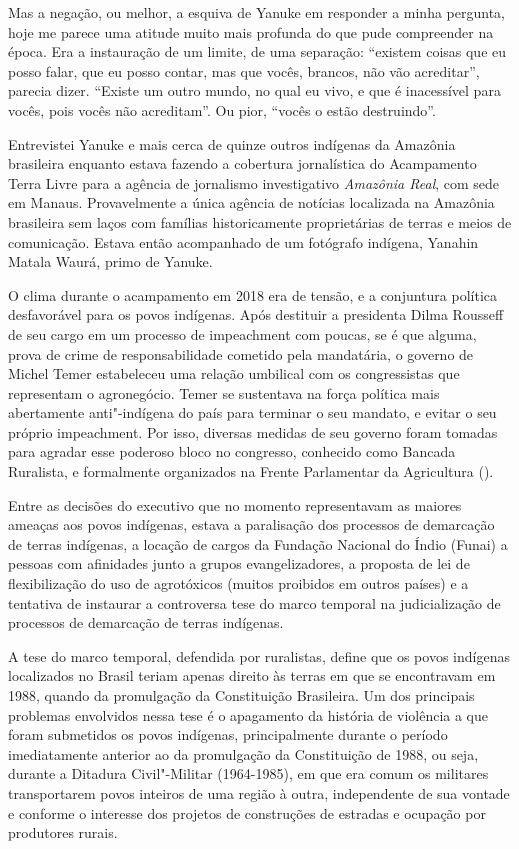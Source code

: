 Mas a negação, ou melhor, a esquiva de Yanuke em responder a minha
pergunta, hoje me parece uma atitude muito mais profunda do que pude
compreender na época. Era a instauração de um limite, de uma separação:
``existem coisas que eu posso falar, que eu posso contar, mas que vocês,
brancos, não vão acreditar'', parecia dizer. ``Existe um outro mundo, no
qual eu vivo, e que é inacessível para vocês, pois vocês não
acreditam''. Ou pior, ``vocês o estão destruindo''.

\asterisc

Entrevistei Yanuke e mais cerca de quinze outros indígenas da Amazônia
brasileira enquanto estava fazendo a cobertura jornalística do
Acampamento Terra Livre para a agência de jornalismo investigativo
\emph{Amazônia Real}, com sede em Manaus. Provavelmente a única agência de
notícias localizada na Amazônia brasileira sem laços com famílias
historicamente proprietárias de terras e meios de comunicação. Estava
então acompanhado de um fotógrafo indígena, Yanahin Matala Waurá, primo
de Yanuke.

O clima durante o acampamento em 2018 era de tensão, e a conjuntura
política desfavorável para os povos indígenas. Após destituir a
presidenta Dilma Rousseff de seu cargo em um processo de impeachment com
poucas, se é que alguma, prova de crime de responsabilidade cometido
pela mandatária, o governo de Michel Temer estabeleceu uma relação
umbilical com os congressistas que representam o agronegócio. Temer se
sustentava na força política mais abertamente anti"-indígena do país para
terminar o seu mandato, e evitar o seu próprio impeachment. Por isso,
diversas medidas de seu governo foram tomadas para agradar esse poderoso
bloco no congresso, conhecido como Bancada Ruralista, e formalmente
organizados na Frente Parlamentar da Agricultura ().

Entre as decisões do executivo que no momento representavam as maiores
ameaças aos povos indígenas, estava a paralisação dos processos de
demarcação de terras indígenas, a locação de cargos da Fundação Nacional
do Índio (Funai) a pessoas com afinidades junto a grupos
evangelizadores, a proposta de lei de flexibilização do uso de
agrotóxicos (muitos proibidos em outros países) e a tentativa de
instaurar a controversa tese do marco temporal na judicialização de
processos de demarcação de terras indígenas.

A tese do marco temporal, defendida por ruralistas, define que os povos
indígenas localizados no Brasil teriam apenas direito às terras em que
se encontravam em 1988, quando da promulgação da Constituição
Brasileira. Um dos principais problemas envolvidos nessa tese é o
apagamento da história de violência a que foram submetidos os povos
indígenas, principalmente durante o período imediatamente anterior ao da
promulgação da Constituição de 1988, ou seja, durante a Ditadura Civil"-Militar
(1964-1985), em que era comum os militares transportarem povos inteiros
de uma região à outra, independente de sua vontade e conforme o
interesse dos projetos de construções de estradas e ocupação por
produtores rurais.

